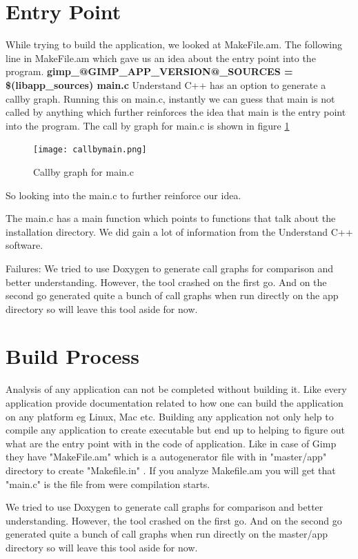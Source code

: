 \section{Entry Point}
While trying to build the application, we looked at MakeFile.am. The following line in MakeFile.am which gave us an idea about the entry point into the program. 
\newline 
\textbf{gimp\_@GIMP\_APP\_VERSION@\_SOURCES = \$(libapp\_sources) main.c}
\newline
Understand C++ has an option to generate a callby graph. Running this on main.c, instantly we can guess that main is not called by anything which further reinforces the idea that main is the entry point into the program. The call by graph for main.c is shown in figure \ref{fig:callbymain}
\begin{figure}
\centering
\texttt{[image: callbymain.png]}
\caption{\label{fig:callbymain}Callby graph for main.c}
\end{figure}

So looking into the main.c to further reinforce our idea.
 
The main.c has a main function which points to functions that talk about the installation directory.
We did gain a lot of information from the Understand C++ software.
 
Failures: We tried to use Doxygen to generate call graphs for comparison and better understanding. However, the tool crashed on the first go. And on the second go generated quite a bunch of call graphs when run directly on the app directory so will leave this tool aside for now.


\section{Build Process}
Analysis of any application can not be completed without building it. Like every application provide documentation related to how one can build the application on any platform eg Linux, Mac etc. Building any application not only help to compile any application to create executable but end up to helping to figure out what are the entry point with in the code of application.  Like in case of Gimp they have "MakeFile.am" which is a autogenerator file with in "master/app" directory to create "Makefile.in" . If you analyze Makefile.am you will get that "main.c" is the file from were compilation starts.

We tried to use Doxygen to generate call graphs for comparison and better understanding. However, the tool crashed on the first go. And on the second go generated quite a bunch of call graphs when run directly on the master/app directory so will leave this tool aside for now.


